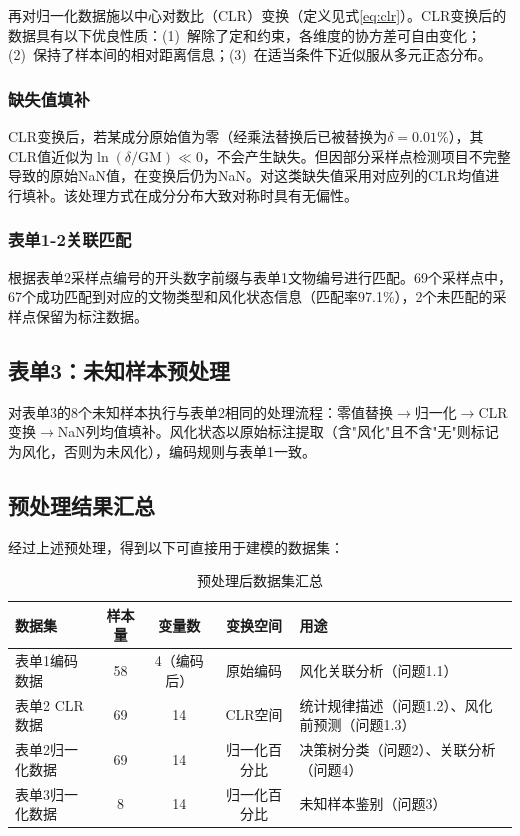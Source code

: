 \documentclass[12pt,a4paper]{ctexart}
\begin{document}
再对归一化数据施以中心对数比（CLR）变换（定义见式\ref{eq:clr}）。CLR变换后的数据具有以下优良性质：(1)~解除了定和约束，各维度的协方差可自由变化；(2)~保持了样本间的相对距离信息；(3)~在适当条件下近似服从多元正态分布。

\subsubsection{缺失值填补}

CLR变换后，若某成分原始值为零（经乘法替换后已被替换为$\delta=0.01\%$），其CLR值近似为$\ln(\delta/\text{GM})\ll0$，不会产生缺失。但因部分采样点检测项目不完整导致的原始NaN值，在变换后仍为NaN。对这类缺失值采用对应列的CLR均值进行填补。该处理方式在成分分布大致对称时具有无偏性。

\subsubsection{表单1-2关联匹配}

根据表单2采样点编号的开头数字前缀与表单1文物编号进行匹配。69个采样点中，67个成功匹配到对应的文物类型和风化状态信息（匹配率97.1\%），2个未匹配的采样点保留为标注数据。

\subsection{表单3：未知样本预处理}

对表单3的8个未知样本执行与表单2相同的处理流程：零值替换$\rightarrow$归一化$\rightarrow$CLR变换$\rightarrow$NaN列均值填补。风化状态以原始标注提取（含"风化"且不含"无"则标记为风化，否则为未风化），编码规则与表单1一致。

\subsection{预处理结果汇总}

经过上述预处理，得到以下可直接用于建模的数据集：

\begin{table}[H]
\centering
\caption{预处理后数据集汇总}
\label{tab:preprocess}
\begin{tabularx}{\textwidth}{lcccY}
\toprule
数据集 & 样本量 & 变量数 & 变换空间 & 用途 \\
\midrule
表单1编码数据 & 58 & 4（编码后）& 原始编码 & 风化关联分析（问题1.1）\\
表单2 CLR数据 & 69 & 14 & CLR空间 & 统计规律描述（问题1.2）、风化前预测（问题1.3）\\
表单2归一化数据 & 69 & 14 & 归一化百分比 & 决策树分类（问题2）、关联分析（问题4）\\
表单3归一化数据 & 8 & 14 & 归一化百分比 & 未知样本鉴别（问题3）\\
\bottomrule
\end{tabularx}
\end{table}
\end{document}
